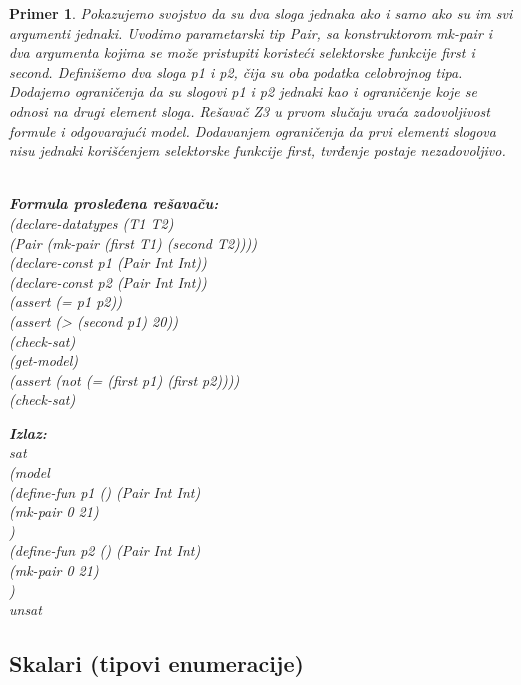 \documentclass[12pt,oneside]{memoir}
\newcommand\tab[1][0.5cm]{\hspace*{#1}}
\newtheorem{primer}{Primer}
\begin{document}
\begin{primer} Pokazujemo svojstvo da su dva sloga jednaka ako i samo ako su im svi argumenti jednaki. Uvodimo parametarski tip Pair, sa konstruktorom mk-pair i dva argumenta kojima se može pristupiti koristeći selektorske funkcije first i second. Definišemo dva sloga p1 i p2, čija su oba podatka celobrojnog tipa. Dodajemo ograničenja da su slogovi p1 i p2 jednaki kao i ograničenje koje se odnosi na drugi element sloga. Rešavač Z3 u prvom slučaju vraća zadovoljivost formule i odgovarajući model. Dodavanjem ograničenja da prvi elementi slogova nisu jednaki korišćenjem selektorske funkcije first, tvrđenje postaje nezadovoljivo.
\\ \\
\begin{minipage}[b]{0.5\textwidth}
\textbf{Formula prosleđena rešavaču:}
\\(declare-datatypes (T1 T2) 
\\\tab[0.3cm](Pair (mk-pair (first T1) (second T2))))
\\(declare-const p1 (Pair Int Int))
\\(declare-const p2 (Pair Int Int))
\\(assert (= p1 p2))
\\(assert (> (second p1) 20))
\\(check-sat)
\\(get-model)
\\(assert (not (= (first p1) (first p2))))
\\(check-sat)
\end{minipage}
\hspace{1.5cm} 
\begin{minipage}[t]{0.5\textwidth}
\vspace{-6.59cm}
\textbf{Izlaz:}
\\sat 
\\(model 
\\\tab(define-fun p1 () (Pair Int Int) 
\\\tab\tab(mk-pair 0 21)
\\\tab) 
\\\tab(define-fun p2 () (Pair Int Int) 
\\\tab\tab(mk-pair 0 21)
\\\tab)
\\unsat
\end{minipage}

\end{primer}
\subsection{Skalari (tipovi enumeracije)}
\end{document}
